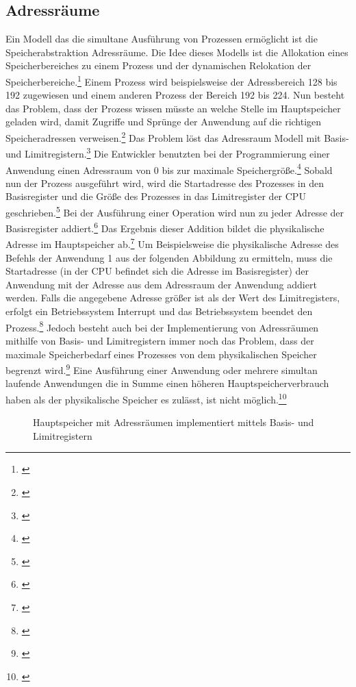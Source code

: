 \subsection{Adressr\"{a}ume}
\label{subsec:Adressraeume}
Ein Modell das die simultane Ausführung von Prozessen ermöglicht ist die Speicherabstraktion Adressräume. Die Idee dieses Modells ist die Allokation eines Speicherbereiches zu einem Prozess und der dynamischen Relokation der Speicherbereiche.\footnote{\cite[S.~244]{Tanenbaum.2016}} Einem Prozess wird beispielsweise der Adressbereich 128 bis 192 zugewiesen und einem anderen Prozess der Bereich 192 bis 224. Nun besteht das Problem, dass der Prozess wissen müsste an welche Stelle im Hauptspeicher geladen wird, damit Zugriffe und Sprünge der Anwendung auf die richtigen Speicheradressen verweisen.\footnote{\cite[S.~244]{Tanenbaum.2016}} Das Problem löst das Adressraum Modell mit Basis- und Limitregistern.\footnote{\cite[S.~244]{Tanenbaum.2016}} Die Entwickler benutzten bei der Programmierung einer Anwendung einen Adressraum von 0 bis zur maximale Speichergröße.\footnote{\cite[S.~244]{Tanenbaum.2016}} Sobald nun der Prozess ausgeführt wird, wird die Startadresse des Prozesses in den Basisregister und die Größe des Prozesses in das Limitregister der \ac{CPU} geschrieben.\footnote{\cite[S.~244]{Tanenbaum.2016}} Bei der Ausführung einer Operation wird nun zu jeder Adresse der Basisregister addiert.\footnote{\cite[S.~244]{Tanenbaum.2016}} Das Ergebnis dieser Addition bildet die physikalische Adresse im Hauptspeicher ab.\footnote{\cite[S.~244]{Tanenbaum.2016}} Um Beispielsweise die physikalische Adresse des Befehls der Anwendung 1 aus der folgenden Abbildung zu ermitteln, muss die Startadresse (in der \ac{CPU} befindet sich die Adresse im Basisregister) der Anwendung mit der Adresse aus dem Adressraum der Anwendung addiert werden. Falls die angegebene Adresse größer ist als der Wert des Limitregisters, erfolgt ein Betriebssystem Interrupt und das Betriebssystem beendet den Prozess.\footnote{\cite[S.~244]{Tanenbaum.2016}} Jedoch besteht auch bei der Implementierung von Adressräumen mithilfe von Basis- und Limitregistern immer noch das Problem, dass der maximale Speicherbedarf eines Prozesses von dem physikalischen Speicher begrenzt wird.\footnote{\cite[S.~244]{Tanenbaum.2016}} Eine Ausführung einer Anwendung oder mehrere simultan laufende Anwendungen die in Summe einen höheren Hauptspeicherverbrauch haben als der physikalische Speicher es zulässt, ist nicht möglich.\footnote{\cite[S.~244]{Tanenbaum.2016}}

\begin{figure}[htb]
	\centering
	\caption{Hauptspeicher mit Adressräumen implementiert mittels Basis- und Limitregistern}
\end{figure}

